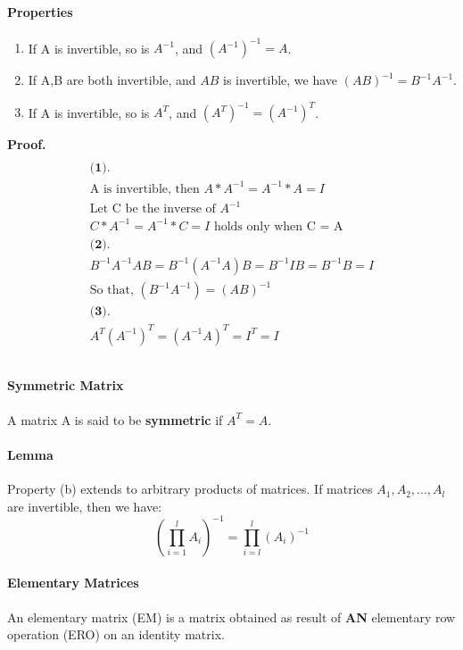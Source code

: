 \documentclass{article}
\begin{document}
	\paragraph{Properties}
	\begin{enumerate}
		\item If A is invertible, so is $A^{-1}$, and $(A^{-1})^{-1} = A$.
		\item If A,B are both invertible, and $AB$ is invertible, we have $(AB)^{-1} = B^{-1}A^{-1}$.
		\item If A is invertible, so is $A^{T}$, and $(A^T)^{-1} = (A^{-1})^T$.
	\end{enumerate}
	\quad
	\newline \textbf{Proof.}
	\begin{multline}
	\\
	\textbf{(1).} \\
		\text{A is invertible, then } A*A^{-1} = A^{-1}*A = I \\
		\text{Let C be the inverse of }A^{-1} \\ 
		C * A^{-1} = A^{-1} * C = I \text{ holds only when C = A}\\
	\textbf{(2).} \\
		B^{-1}A^{-1}A B = B^{-1}(A^{-1}A)B = B^{-1}IB = B^{-1}B = I\\
		\text{So that, }(B^{-1}A^{-1}) = (AB) ^ {-1} \\
	\textbf{(3).} \\
	A^T(A^{-1})^T = (A^{-1}A)^T = I^T = I \\
	\\
	\end{multline}
	\paragraph{Symmetric Matrix} A matrix A is said to be \textbf{symmetric} if $A^T = A$.
	\paragraph{Lemma} Property (b) extends to arbitrary products of matrices. If matrices $A_1, A_2, ... , A_l$ are invertible, then we have:
	\[
	(\prod_{i=1}^{l} A_i) ^ {-1} = \prod_{i=l}^{l}(A_i)^{-1}
	\]
	\paragraph{Elementary Matrices} An elementary matrix (EM) is a matrix obtained as result of \textbf{AN} elementary row operation (ERO) on an identity matrix.
\end{document}
